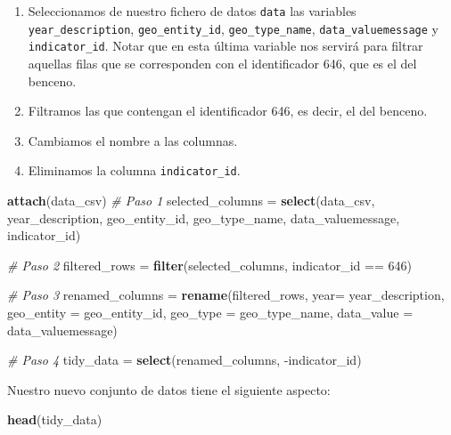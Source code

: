 \documentclass[12pt,spanish,]{article}
\newenvironment{Shaded}{\begin{snugshade}}{\end{snugshade}}
\newcommand{\KeywordTok}[1]{\textcolor[rgb]{0.13,0.29,0.53}{\textbf{{#1}}}}
\newcommand{\DataTypeTok}[1]{\textcolor[rgb]{0.13,0.29,0.53}{{#1}}}
\newcommand{\DecValTok}[1]{\textcolor[rgb]{0.00,0.00,0.81}{{#1}}}
\newcommand{\StringTok}[1]{\textcolor[rgb]{0.31,0.60,0.02}{{#1}}}
\newcommand{\CommentTok}[1]{\textcolor[rgb]{0.56,0.35,0.01}{\textit{{#1}}}}
\newcommand{\NormalTok}[1]{{#1}}
\begin{document}
\begin{enumerate}
\def\labelenumi{\arabic{enumi}.}
\item
  Seleccionamos de nuestro fichero de datos \texttt{data} las variables
  \texttt{year\_description}, \texttt{geo\_entity\_id},
  \texttt{geo\_type\_name}, \texttt{data\_valuemessage} y
  \texttt{indicator\_id}. Notar que en esta última variable nos servirá
  para filtrar aquellas filas que se corresponden con el identificador
  646, que es el del benceno.
\item
  Filtramos las que contengan el identificador 646, es decir, el del
  benceno.
\item
  Cambiamos el nombre a las columnas.
\item
  Eliminamos la columna \texttt{indicator\_id}.
\end{enumerate}

\begin{Shaded}
\begin{Highlighting}[]
\KeywordTok{attach}\NormalTok{(data_csv)}
\CommentTok{# Paso 1}
\NormalTok{selected_columns =}\StringTok{ }\KeywordTok{select}\NormalTok{(data_csv, }
                          \NormalTok{year_description, }
                          \NormalTok{geo_entity_id, }
                          \NormalTok{geo_type_name, }
                          \NormalTok{data_valuemessage, }
                          \NormalTok{indicator_id)}

\CommentTok{# Paso 2}
\NormalTok{filtered_rows =}\StringTok{ }\KeywordTok{filter}\NormalTok{(selected_columns, indicator_id ==}\StringTok{ }\DecValTok{646}\NormalTok{)}

\CommentTok{# Paso 3}
\NormalTok{renamed_columns =}\StringTok{ }\KeywordTok{rename}\NormalTok{(filtered_rows,  }\DataTypeTok{year=} \NormalTok{year_description, }
                         \DataTypeTok{geo_entity =} \NormalTok{geo_entity_id, }
                         \DataTypeTok{geo_type =} \NormalTok{geo_type_name,}
                         \DataTypeTok{data_value =} \NormalTok{data_valuemessage)}


\CommentTok{# Paso 4}
\NormalTok{tidy_data =}\StringTok{ }\KeywordTok{select}\NormalTok{(renamed_columns, -indicator_id)}
\end{Highlighting}
\end{Shaded}

Nuestro nuevo conjunto de datos tiene el siguiente aspecto:

\begin{Shaded}
\begin{Highlighting}[]
\KeywordTok{head}\NormalTok{(tidy_data)}
\end{Highlighting}
\end{Shaded}
\end{document}
